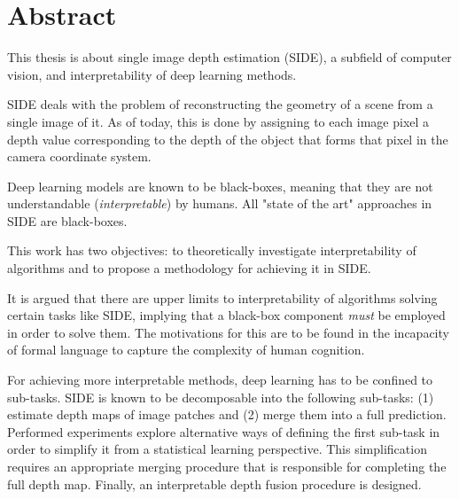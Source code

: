 \chapter*{Abstract}

This thesis is about single image depth estimation (SIDE), a subfield of computer vision, and interpretability of deep learning methods.

SIDE deals with the problem of reconstructing the geometry of a scene from a single image of it.
As of today, this is done by assigning to each image pixel a depth value corresponding to the depth of the object that forms that pixel in the camera coordinate system.

Deep learning models are known to be black-boxes, meaning that they are not understandable (\textit{interpretable}) by humans.
All "state of the art" approaches in SIDE are black-boxes.

This work has two objectives: to theoretically investigate interpretability of algorithms and to propose a methodology for achieving it in SIDE.

It is argued that there are upper limits to interpretability of algorithms solving certain tasks like SIDE, implying that a black-box component \textit{must} be employed in order to solve them.
The motivations for this are to be found in the incapacity of formal language to capture the complexity of human cognition.

For achieving more interpretable methods, deep learning has to be confined to sub-tasks.
SIDE is known to be decomposable into the following sub-tasks: (1) estimate depth maps of image patches and (2) merge them into a full prediction.
Performed experiments explore alternative ways of defining the first sub-task in order to simplify it from a statistical learning perspective.
This simplification requires an appropriate merging procedure that is responsible for completing the full depth map.
Finally, an interpretable depth fusion procedure is designed.

\thispagestyle{empty}
\mbox{}
\newpage
